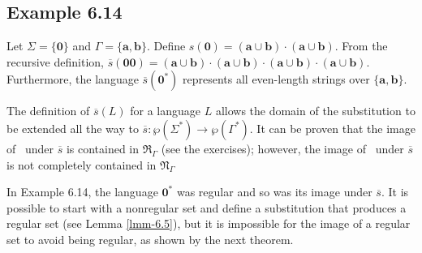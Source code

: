 \subsection*{Example 6.14}

Let $\Sigma=\{\pmb{0}\}$ and $\Gamma=\{\pmb{a},\pmb{b}\}$. Define $s(\pmb{0}) =
(\pmb{a}\cup\pmb{b})\cdot(\pmb{a}\cup\pmb{b})$. From the recursive definition,
$\overline{s}(\pmb{00}) = (\pmb{a}\cup\pmb{b})\cdot(\pmb{a}\cup\pmb{b})\cdot
(\pmb{a}\cup\pmb{b})\cdot(\pmb{a}\cup\pmb{b})$. Furthermore, the language
$\overline{s}(\pmb{0}^*)$ represents all even-length strings over $\{\pmb{a},
\pmb{b}\}$.

The definition of $\overline{s}(L)$ for a language $L$ allows the domain of the
substitution to be extended all the way to $\overline{s}$$: \wp(\Sigma^*) \rightarrow \wp
(\Gamma^*)$. It can be proven that the image of \RSIG\ under $\overline{s}$ is
contained in $\mathfrak{R}_{\Gamma}$ (see the exercises); however, the image of
\NSIG\ under $\overline{s}$ is not completely contained in $\mathfrak{N}_{\Gamma}$

In Example 6.14, the language $\pmb{0}^*$ was regular and so was its image under
$\overline{s}$. %
It is possible to start with a nonregular set and define a substitution that
produces a regular set (see Lemma \ref{lmm-6.5}), but it is impossible for the image of a
regular set to avoid being regular, as shown by the next theorem.

